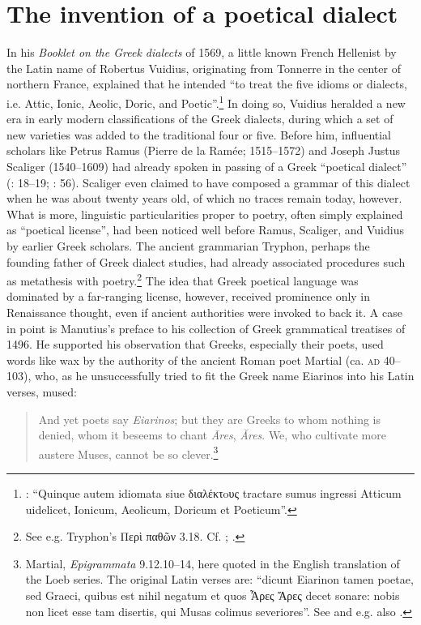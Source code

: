 \section{The invention of a poetical dialect}\label{sec:2.7}

In his \textit{Booklet on the Greek dialects} of 1569, a little known French Hellenist by the Latin name of Robertus Vuidius, originating from Tonnerre in the center of northern France, explained that he intended “to treat the five idioms or dialects, i.e. Attic, Ionic, Aeolic, Doric, and Poetic”.\footnote{\citet[137\textsc{\textsuperscript{v}}]{Vuidius1569}: “Quinque autem idiomata siue διαλέκτoυς tractare sumus ingressi Atticum uidelicet, Ionicum, Aeolicum, Doricum et Poeticum”.} In doing so, Vuidius heralded a new era in early modern classifications of the Greek dialects, during which a set of new varieties was added to the traditional four or five. Before him, influential scholars like Petrus Ramus (Pierre de la Ramée; 1515–1572) and Joseph Justus Scaliger (1540–1609) had already spoken in passing of a Greek “poetical dialect” (\citealt{Ramus1560}: 18–19; \citealt{Scaliger1594}: 56). Scaliger even claimed to have composed a grammar of this dialect when he was about twenty years old, of which no traces remain today, however. What is more, linguistic particularities proper to poetry, often simply explained as “poetical license”, had been noticed well before Ramus, Scaliger, and Vuidius by earlier Greek scholars. The ancient grammarian Tryphon, perhaps the founding father of Greek dialect studies, had already associated procedures such as metathesis with poetry.\footnote{See e.g. Tryphon’s Περὶ παθῶν 3.18. Cf. ; \citet[209, 230, 235]{Vergara1537}.} The idea that Greek poetical language was dominated by a far-ranging license, however, received prominence only in Renaissance thought, even if ancient authorities were invoked to back it. A case in point is Manutius’s preface to his collection of Greek grammatical treatises of 1496. He supported his observation that Greeks, especially their poets, used words like wax by the authority of the ancient Roman poet Martial (ca. \textsc{ad} 40–103), who, as he unsuccessfully tried to fit the Greek name Eiarinos into his Latin verses, mused:

\begin{quote}
And yet poets say \textit{Eiarinos}; {\textbar} but they are Greeks to whom nothing is denied, {\textbar} whom it beseems to chant \textit{Āres}, \textit{Ăres}. {\textbar} We, who cultivate more austere Muses, {\textbar} cannot be so clever.\footnote{Martial, \textit{Epigrammata} 9.12.10–14, here quoted in the English translation of the Loeb series. The original Latin verses are: “dicunt Eiarinon tamen poetae, {\textbar} sed Graeci, quibus est nihil negatum {\textbar} et quos Ἆρες Ἄρες decet sonare: {\textbar} nobis non licet esse tam disertis, {\textbar} qui Musas colimus severiores”. See \citet[*.ii\textsc{\textsuperscript{v}}]{Manutius1496Aldus} and e.g. also \citet[187 \textsc{\textsuperscript{r}}]{Enoch1555}.}
\end{quote}

